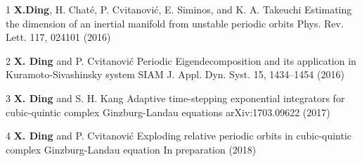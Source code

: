 
\begin{cvpub}

  \cvpubentry
  {1}
  {\textbf{X.Ding},  H. Chat\'e, P. Cvitanovi\'c, E. Siminos, and K. A. Takeuchi}
  {Estimating the dimension of an inertial manifold from unstable periodic orbits}
  {Phys. Rev. Lett. 117, 024101 (2016)}

  \cvpubentry
  {2}
  {\textbf{X. Ding} and P. Cvitanovi\'c}
  {Periodic Eigendecomposition and its application in Kuramoto-Sivashinsky system}
  {SIAM J. Appl. Dyn. Syst. 15, 1434–1454 (2016)}

  \cvpubentry
  {3}
  {\textbf{X. Ding} and S. H. Kang}
  {Adaptive time-stepping exponential integrators for cubic-quintic complex Ginzburg-Landau equations}
  {arXiv:1703.09622 (2017)}

  \cvpubentry
  {4}
  {\textbf{X. Ding} and P. Cvitanovi\'c}
  {Exploding relative periodic orbits in cubic-quintic complex Ginzburg-Landau equation}
  {In preparation (2018)}


\end{cvpub}
